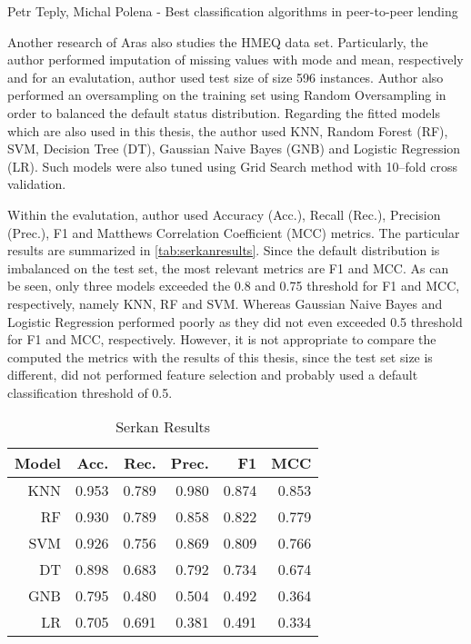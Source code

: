 Petr Teply, Michal Polena - Best classification algorithms in peer-to-peer lending


Another research of Aras \citep{serkan2021bagging} also studies the HMEQ data set.
Particularly, the author performed imputation of missing values with mode and mean, respectively and for an evalutation, author used test size of size 596 instances.
Author also performed an oversampling on the training set using Random Oversampling in order to balanced the default status distribution.
Regarding the fitted models which are also used in this thesis, the author used KNN, Random Forest (RF), SVM, Decision Tree (DT), Gaussian Naive Bayes (GNB) and Logistic Regression (LR).
Such models were also tuned using Grid Search method with 10--fold cross validation.

Within the evalutation, author used Accuracy (Acc.), Recall (Rec.), Precision (Prec.), F1 and Matthews Correlation Coefficient (MCC) metrics. The particular results are summarized in \autoref{tab:serkanresults}.
Since the default distribution is imbalanced on the test set, the most relevant metrics are F1 and MCC.
As can be seen, only three models exceeded the 0.8 and 0.75 threshold for F1 and MCC, respectively, namely KNN, RF and SVM. Whereas Gaussian Naive Bayes and Logistic Regression performed poorly as they did not even exceeded 0.5 threshold for F1 and MCC, respectively.
However, it is not appropriate to compare the computed the metrics with the results of this thesis, since the test set size is different, did not performed feature selection and probably used a default classification threshold of 0.5.
\begin{table}[H]
    \small
    \setlength{\tabcolsep}{8pt}
    \renewcommand{\arraystretch}{1.3}
    \centering
    \caption[Serkan Results]{Serkan Results}\label{tab:serkanresults}
    \begin{tabular}{r r r r r r}
    \toprule
    Model & Acc. & Rec. & Prec. & F1 & MCC \\
    \midrule
    \hline
	
	KNN & 0.953 & 0.789 & 0.980 & 0.874 & 0.853 \\
    RF & 0.930 & 0.789 & 0.858 & 0.822 & 0.779 \\
    SVM & 0.926 & 0.756 & 0.869 & 0.809 & 0.766 \\
    DT & 0.898 & 0.683 & 0.792 & 0.734 & 0.674 \\
    GNB & 0.795 & 0.480 & 0.504 & 0.492 & 0.364 \\
	LR & 0.705 & 0.691 & 0.381 & 0.491 & 0.334 \\
	
    \hline
    \bottomrule
    \end{tabular}
    \vspace{0.35em}
    
    \vspace{-1em}
\end{table}

